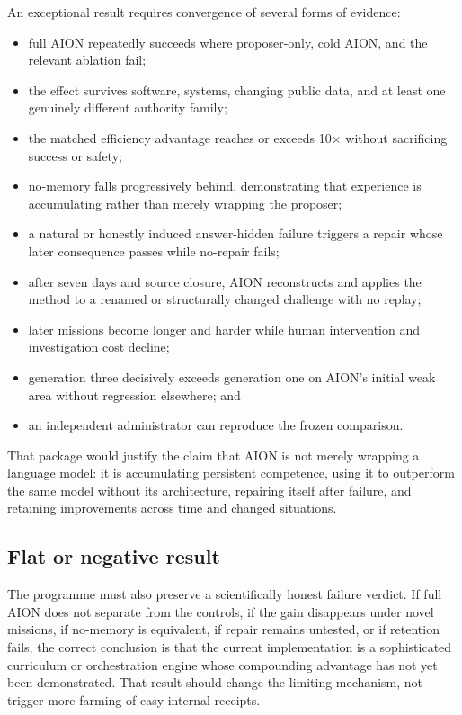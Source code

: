 \documentclass[11pt,a4paper]{article}
\begin{document}
An exceptional result requires convergence of several forms of evidence:
\begin{itemize}
    \item full AION repeatedly succeeds where proposer-only, cold AION, and the
          relevant ablation fail;
    \item the effect survives software, systems, changing public data, and at
          least one genuinely different authority family;
    \item the matched efficiency advantage reaches or exceeds 10$\times$
          without sacrificing success or safety;
    \item no-memory falls progressively behind, demonstrating that experience
          is accumulating rather than merely wrapping the proposer;
    \item a natural or honestly induced answer-hidden failure triggers a
          repair whose later consequence passes while no-repair fails;
    \item after seven days and source closure, AION reconstructs and applies the
          method to a renamed or structurally changed challenge with no replay;
    \item later missions become longer and harder while human intervention and
          investigation cost decline;
    \item generation three decisively exceeds generation one on AION's initial
          weak area without regression elsewhere; and
    \item an independent administrator can reproduce the frozen comparison.
\end{itemize}

That package would justify the claim that AION is not merely wrapping a
language model: it is accumulating persistent competence, using it to
outperform the same model without its architecture, repairing itself after
failure, and retaining improvements across time and changed situations.

\subsection{Flat or negative result}

The programme must also preserve a scientifically honest failure verdict.  If
full AION does not separate from the controls, if the gain disappears under
novel missions, if no-memory is equivalent, if repair remains untested, or if
retention fails, the correct conclusion is that the current implementation is
a sophisticated curriculum or orchestration engine whose compounding advantage
has not yet been demonstrated.  That result should change the limiting
mechanism, not trigger more farming of easy internal receipts.
\end{document}
